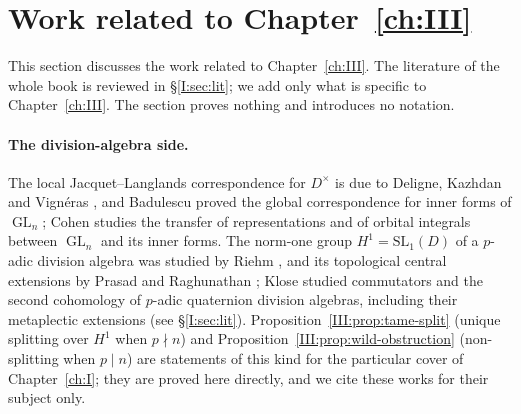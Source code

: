 \endgroup
\begingroup
\providecommand{\A}{}\renewcommand{\A}{\mathbb A}
\providecommand{\C}{}\renewcommand{\C}{\mathbb C}
\providecommand{\Z}{}\renewcommand{\Z}{\mathbb Z}
\providecommand{\GL}{}\renewcommand{\GL}{\operatorname{GL}}
\providecommand{\Nrd}{}\renewcommand{\Nrd}{\operatorname{Nrd}}
\providecommand{\Irr}{}\renewcommand{\Irr}{\operatorname{Irr}}
\providecommand{\vol}{}\renewcommand{\vol}{\operatorname{vol}}
\providecommand{\tH}{}\renewcommand{\tH}{\widetilde H}
\providecommand{\tZ}{}\renewcommand{\tZ}{\widetilde Z}
\providecommand{\ttT}{}\renewcommand{\ttT}{\widetilde T}
\providecommand{\reg}{}\renewcommand{\reg}{\mathrm{reg}}
\providecommand{\gen}{}\renewcommand{\gen}{\mathrm{gen}}
\providecommand{\JL}{}\renewcommand{\JL}{\mathrm{JL}}
\providecommand{\Sha}{}\renewcommand{\Sha}{\operatorname{Sha}}
\providecommand{\Gb}{}\renewcommand{\Gb}{\overline{G}}
\providecommand{\GDb}{}\renewcommand{\GDb}{\overline{G}_D}
\providecommand{\Zb}{}\renewcommand{\Zb}{\overline{Z}}
\providecommand{\Ptag}{}\renewcommand{\Ptag}{\textnormal{\textbf{(P)}}}
\providecommand{\Etag}{}\renewcommand{\Etag}{\textnormal{\textbf{(E)}}}
\providecommand{\Otag}{}\renewcommand{\Otag}{\textnormal{\textbf{(O)}}}
\providecommand{\Ctag}{}\renewcommand{\Ctag}{\textnormal{\textbf{(C)}}}
\section{Work related to \texorpdfstring{Chapter~\ref{ch:III}}{Chapter 6}}\label{III:sec:related}
This section discusses the work related to Chapter~\ref{ch:III}. The literature of the whole book is reviewed in \S\ref{I:sec:lit}; we add only what is specific to Chapter~\ref{ch:III}. The section proves nothing and introduces no notation.

\paragraph{The division-algebra side.} The local Jacquet--Langlands correspondence for $D^\times$ is due to Deligne, Kazhdan and Vign\'eras \cite{DKV84}, and Badulescu \cite{Bad08} proved the global correspondence for inner forms of $\GL_n$; Cohen \cite{Coh18} studies the transfer of representations and of orbital integrals between $\GL_n$ and its inner forms. The norm-one group $H^1=\mathrm{SL}_1(D)$ of a $p$-adic division algebra was studied by Riehm \cite{Rie70}, and its topological central extensions by Prasad and Raghunathan \cite{PR88}; Klose \cite{Klo86a} studied commutators and the second cohomology of $p$-adic quaternion division algebras, including their metaplectic extensions (see \S\ref{I:sec:lit}). Proposition~\ref{III:prop:tame-split} (unique splitting over $H^1$ when $p\nmid n$) and Proposition~\ref{III:prop:wild-obstruction} (non-splitting when $p\mid n$) are statements of this kind for the particular cover of Chapter~\ref{ch:I}; they are proved here directly, and we cite these works for their subject only.

